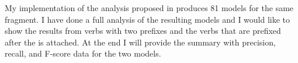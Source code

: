 My implementation of the analysis proposed in \citet{Tatevosov:09} produces 81 models for the same fragment. I have done a full analysis of the resulting models and I would like to show the results from verbs with two prefixes and the verbs that are prefixed after the  is attached. At the end I will provide the summary with precision, recall, and F-score data for the two models.

% 

